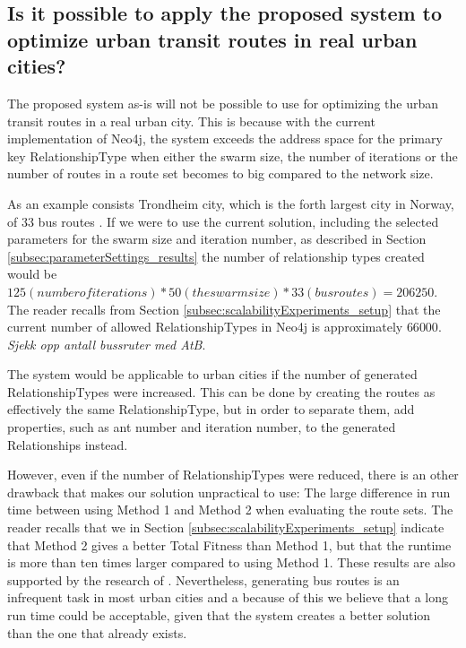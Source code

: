 

\subsection{Is it possible to apply the proposed system to optimize urban transit routes in real urban cities?}

The proposed system as-is will not be possible to use for optimizing the urban transit routes in a real urban city. This is because with the current implementation of Neo4j, the system exceeds the address space for the primary key RelationshipType when either the swarm size, the number of iterations or the number of routes in a route set becomes to big compared to the network size. 

As an example consists Trondheim city, which is the forth largest city in Norway, of 33 bus routes \cite{website:atb-linjenett}. If we were to use the current solution, including the selected parameters for the swarm size and iteration number, as described in Section \vref{subsec:parameterSettings_results} the number of relationship types created would be $125 (number of iterations) * 50 (the swarm size) * 33 (bus routes) = 206 250$. The reader recalls from Section \vref{subsec:scalabilityExperiments_setup} that the current number of allowed RelationshipTypes in Neo4j is approximately $66 000$.
\emph{\color{blue} Sjekk opp antall bussruter med AtB}.

The system would be applicable to urban cities if the number of generated RelationshipTypes were increased. This can be done by creating the routes as effectively the same RelationshipType, but in order to separate them, add properties, such as ant number and iteration number, to the generated Relationships instead.  

However, even if the number of RelationshipTypes were reduced, there is an other drawback that makes our solution unpractical to use: The large difference in run time between using Method 1 and Method 2 when evaluating the route sets. 
The reader recalls that we in Section \vref{subsec:scalabilityExperiments_setup} indicate that Method 2 gives a better Total Fitness than Method 1, but that the runtime is more than ten times larger compared to using Method 1. These results are also supported by the research of \citet{fan09}. Nevertheless, generating bus routes is an infrequent task in most urban cities and a because of this we believe that a long run time could be acceptable, given that the system creates a better solution than the one that already exists. 

